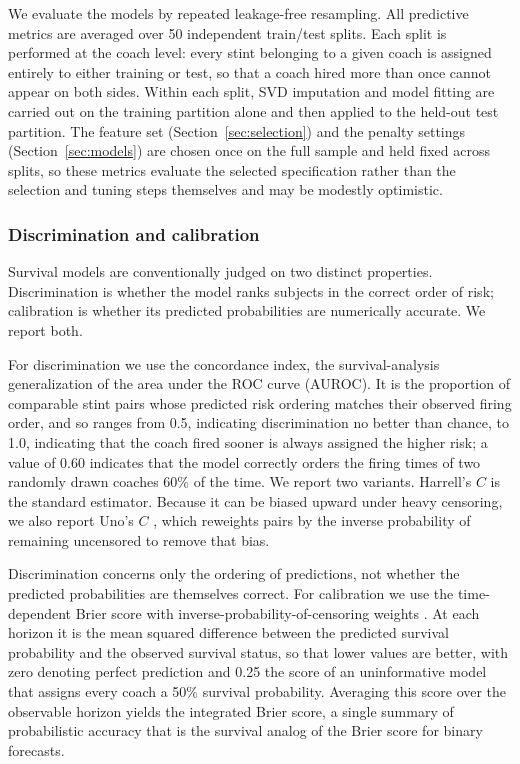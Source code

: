 \documentclass[12pt,USenglish]{article}
\begin{document}
We evaluate the models by repeated leakage-free resampling. All predictive metrics are averaged over 50 independent train/test splits. Each split is performed at the coach level: every stint belonging to a given coach is assigned entirely to either training or test, so that a coach hired more than once cannot appear on both sides. Within each split, SVD imputation and model fitting are carried out on the training partition alone and then applied to the held-out test partition. The feature set (Section~\ref{sec:selection}) and the penalty settings (Section~\ref{sec:models}) are chosen once on the full sample and held fixed across splits, so these metrics evaluate the selected specification rather than the selection and tuning steps themselves and may be modestly optimistic.

\subsubsection{Discrimination and calibration}

Survival models are conventionally judged on two distinct properties. Discrimination is whether the model ranks subjects in the correct order of risk; calibration is whether its predicted probabilities are numerically accurate. We report both.

For discrimination we use the concordance index, the survival-analysis generalization of the area under the ROC curve (AUROC). It is the proportion of comparable stint pairs whose predicted risk ordering matches their observed firing order, and so ranges from 0.5, indicating discrimination no better than chance, to 1.0, indicating that the coach fired sooner is always assigned the higher risk; a value of 0.60 indicates that the model correctly orders the firing times of two randomly drawn coaches 60\% of the time. We report two variants. Harrell's $C$ \citep{harrell1996} is the standard estimator. Because it can be biased upward under heavy censoring, we also report Uno's $C$ \citep{uno2011}, which reweights pairs by the inverse probability of remaining uncensored to remove that bias.

Discrimination concerns only the ordering of predictions, not whether the predicted probabilities are themselves correct. For calibration we use the time-dependent Brier score with inverse-probability-of-censoring weights \citep{graf1999}. At each horizon it is the mean squared difference between the predicted survival probability and the observed survival status, so that lower values are better, with zero denoting perfect prediction and 0.25 the score of an uninformative model that assigns every coach a 50\% survival probability. Averaging this score over the observable horizon yields the integrated Brier score, a single summary of probabilistic accuracy that is the survival analog of the Brier score for binary forecasts.
\end{document}
